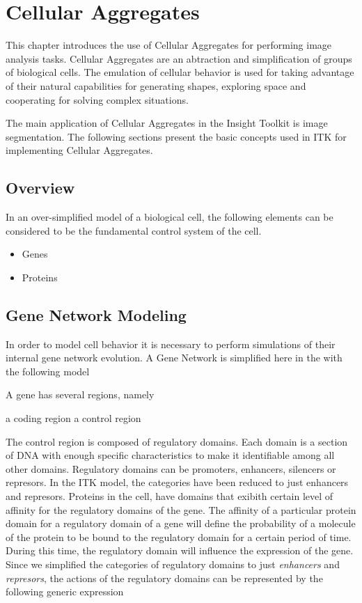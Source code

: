 
\chapter{Cellular Aggregates}

This chapter introduces the use of Cellular Aggregates for performing image
analysis tasks. Cellular Aggregates are an abtraction and simplification of
groups of biological cells. The emulation of cellular behavior is used for
taking advantage of their natural capabilities for generating shapes, exploring
space and cooperating for solving complex situations. 

The main application of Cellular Aggregates in the Insight Toolkit is image
segmentation. The following sections present the basic concepts used in ITK for
implementing Cellular Aggregates.

\section{Overview}

In an over-simplified model of a biological cell, the following elements can be
considered to be the fundamental control system of the cell.

\begin{itemize}
\item Genes
\item Proteins
\end{itemize}

\section{Gene Network Modeling}

In order to model cell behavior it is necessary to perform simulations of their 
internal gene network evolution. A Gene Network is simplified here in the with the
following model

A gene has several regions, namely

a coding region
a control region

The control region is composed of regulatory domains. Each domain is a section
of DNA with enough specific characteristics to make it identifiable among all
other domains.  Regulatory domains can be promoters, enhancers, silencers or
represors.  In the ITK model, the categories have been reduced to just
enhancers and represors.  Proteins in the cell, have domains that exibith
certain level of affinity for the regulatory domains of the gene. The affinity
of a particular protein domain for a regulatory domain of a gene will define
the probability of a molecule of the protein to be bound to the regulatory
domain for a certain period of time.  During this time, the regulatory domain
will influence the expression of the gene. Since we simplified the categories
of regulatory domains to just \emph{enhancers} and \emph{represors}, the
actions of the regulatory domains can be represented by the following generic
expression

